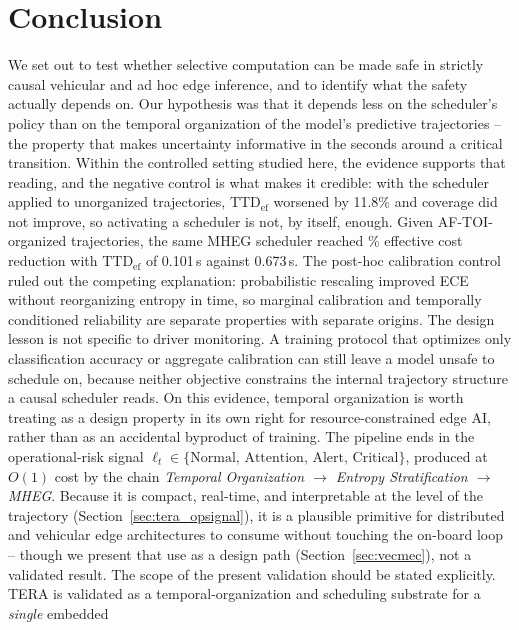 \documentclass[a4paper,fleqn]{cas-dc}
\newcommand{\MHEG}{\mbox{MHEG}\xspace}
\begin{document}
\section{Conclusion}
\label{sec:conclusao}
We set out to test whether selective computation can be made safe in strictly
causal vehicular and ad hoc edge inference, and to identify what the safety actually
depends on. Our hypothesis was that it depends less on the scheduler's policy than
on the temporal organization of the model's predictive trajectories -- the property
that makes uncertainty informative in the seconds around a critical transition.
Within the controlled setting studied here, the evidence supports that reading, and
the negative control is what makes it credible: with the scheduler applied to
unorganized trajectories, $\mathrm{TTD}_{\mathrm{ef}}$ worsened by 11.8\% and
coverage did not improve, so activating a scheduler is not, by itself, enough. Given
\mbox{AF-TOI}-organized trajectories, the same \MHEG scheduler reached \CostReduction\%
effective cost reduction with $\mathrm{TTD}_{\mathrm{ef}}$ of 0.101\,s against
0.673\,s. The post-hoc calibration control ruled out the competing explanation:
probabilistic rescaling improved ECE without reorganizing entropy in time, so
marginal calibration and temporally conditioned reliability are separate properties
with separate origins.
The design lesson is not specific to driver monitoring. A training protocol that
optimizes only classification accuracy or aggregate calibration can still leave a
model unsafe to schedule on, because neither objective constrains the internal
trajectory structure a causal scheduler reads. On this evidence, temporal
organization is worth treating as a design property in its own right for
resource-constrained edge AI, rather than as an accidental byproduct of training.
The pipeline ends in the operational-risk signal
$\ell_t \in \{\text{Normal},\, \text{Attention},\, \text{Alert},\, \text{Critical}\}$,
produced at $O(1)$ cost by the chain \emph{Temporal Organization $\rightarrow$
Entropy Stratification $\rightarrow$ MHEG}. Because it is compact, real-time, and
interpretable at the level of the trajectory (Section~\ref{sec:tera_opsignal}), it is
a plausible primitive for distributed and vehicular edge architectures to consume
without touching the on-board loop -- though we present that use as a design path
(Section~\ref{sec:vecmec}), not a validated result.
The scope of the present validation should be stated explicitly. TERA is validated
as a temporal-organization and scheduling substrate for a \emph{single} embedded
\end{document}

